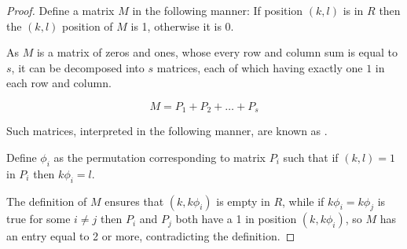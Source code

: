 \begin{proof}
Define a matrix $M$ in the following manner: If position $(k,l)$ is  in $R$ then the $(k,l)$ position of $M$ is 1, otherwise it is 0.

As $M$ is a matrix of zeros and ones, whose every row and column sum is equal to $s$, it can be decomposed into $s$ matrices, each of which having exactly one $1$ in each row and column.

\begin{equation}
M = P_1 + P_2 + \ldots + P_s
\end{equation}

Such matrices, interpreted in the following manner, are known as .

Define $\phi_i$ as the permutation corresponding to matrix $P_i$ such that if $(k,l) = 1$ in $P_i$ then $k\phi _i = l$.

The definition of $M$ ensures that $(k, k\phi _i)$ is empty in $R$, while if $k\phi_{i} = k\phi_{j}$ is true for some $i \neq j$ then $P_i$ and $P_j$ both have a 1 in position $(k, k\phi_i)$, so $M$ has an entry equal to 2 or more, contradicting the definition.
\end{proof}

